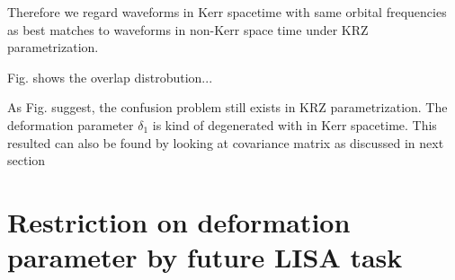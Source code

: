 \documentclass{article}
\begin{document}
Therefore we regard waveforms in Kerr spacetime with same orbital frequencies as best matches to waveforms in non-Kerr space time under KRZ parametrization.

Fig. shows the overlap distrobution...

As Fig. suggest, the confusion problem still exists in KRZ parametrization. The deformation parameter $\delta_1$ is kind of degenerated with   in Kerr spacetime. This resulted can also be found by looking at covariance matrix as discussed in next section
\section{Restriction on deformation parameter by future LISA task}
\end{document}
